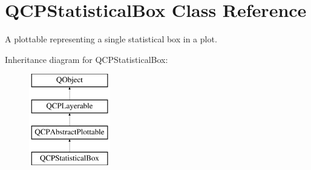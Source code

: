 \hypertarget{classQCPStatisticalBox}{\section{Q\-C\-P\-Statistical\-Box Class Reference}
\label{classQCPStatisticalBox}
}


A plottable representing a single statistical box in a plot.  


Inheritance diagram for Q\-C\-P\-Statistical\-Box\-:\begin{figure}[H]
\begin{center}
\leavevmode
\includegraphics[height=4.000000cm]{classQCPStatisticalBox}
\end{center}
\end{figure}
